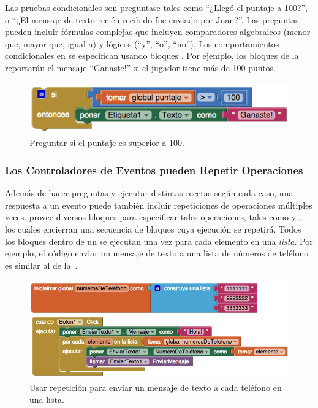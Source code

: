 \documentclass[letterpaper]{article}
\begin{document}
Las pruebas condicionales son preguntase tales como ``¿Llegó el
puntaje a 100?'', o ``¿El mensaje de texto recién recibido fue enviado
por Juan?''.  Las preguntas pueden incluir fórmulas complejas que
incluyen comparadores algebraicos (menor que, mayor que, igual a) y
lógicos (“y”, “o”, “no”). Los comportamientos condicionales en
\AppInventor se especifican usando bloques . Por
ejemplo, los bloques de la~ reportarán el mensaje
``Ganaste!'' si el jugador tiene más de 100 puntos.

\begin{figure}[H]
\centering
\includegraphics[scale=0.5]{figures/Score}
\caption{Preguntar si el puntaje es superior a 100.}
\label{fig:score}
\end{figure}

\subsubsection*{Los Controladores de Eventos pueden Repetir Operaciones}
Además de hacer preguntas y ejecutar distintas recetas según cada
caso, una respuesta a un evento puede también incluir repeticiones de
operaciones múltiples veces. \AppInventor provee diversos bloques para
especificar tales operaciones, tales como  y
, los cuales encierran una
secuencia de bloques cuya ejecución se repetirá. Todos los bloques
dentro de un  se ejecutan una vez para cada elemento
en una \emph{lista}. Por ejemplo, el código enviar un mensaje de texto a
una lista de números de teléfono es similar al de
la~.

\begin{figure}[H]
\centering
\includegraphics[scale=0.5]{figures/Foreach}
\caption{Usar repetición para enviar un mensaje de texto a cada
  teléfono en una lista.}
\label{fig:foreach}
\end{figure}
\end{document}
